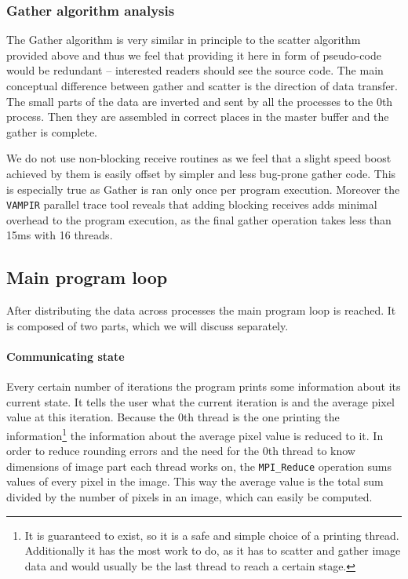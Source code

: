 \documentclass[11pt,a4paper]{article}
\begin{document}
\subsubsection{Gather algorithm analysis}
The Gather algorithm is very similar in principle to the scatter algorithm provided above and thus we feel that providing it here in form of pseudo-code would be redundant -- interested readers should see the source code. 
The main conceptual difference between gather and scatter is the direction of data transfer. 
The small parts of the data are inverted and sent by all the processes to the 0th process. 
Then they are assembled in correct places in the master buffer and the gather is complete.

We do not use non-blocking receive routines as we feel that a slight speed boost achieved by them is easily offset by simpler and less bug-prone gather code. 
This is especially true as Gather is ran only once per program execution. 
Moreover the \texttt{VAMPIR} parallel trace tool reveals that adding blocking receives adds minimal overhead to the program execution, as the final gather operation takes less than 15ms with 16 threads.

\subsection{Main program loop}
After distributing the data across processes the main program loop is reached. It is composed of two parts, which we will discuss separately.

\paragraph{Communicating state}
Every certain number of iterations the program prints some information about its current state. 
It tells the user what the current iteration is and the average pixel value at this iteration.
Because the 0th thread is the one printing the information\footnote{It is guaranteed to exist, so it is a safe and simple choice of a printing thread. Additionally it has the most work to do, as it has to scatter and gather image data and would usually be the last thread to reach a certain stage.} the information about the average pixel value is reduced to it. 
In order to reduce rounding errors and the need for the 0th thread to know dimensions of image part each thread works on, the \texttt{MPI\_Reduce} operation sums values of every pixel in the image.
This way the average value is the total sum divided by the number of pixels in an image, which can easily be computed.
\end{document}
